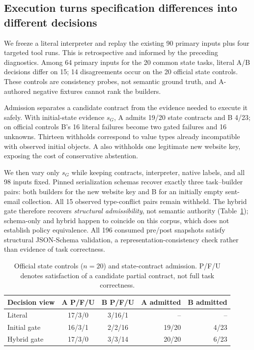 \subsection{Execution turns specification differences into different decisions}
\label{sec:contract-execution}
We freeze a literal interpreter and replay the existing 90 primary inputs plus four targeted tool runs. This is retrospective and informed by the preceding diagnostics. Among 64 primary inputs for the 20 common state tasks, literal A/B decisions differ on 15; 14 disagreements occur on the 20 official state controls. These controls are consistency probes, not semantic ground truth, and A-authored negative fixtures cannot rank the builders.

Admission separates a candidate contract from the evidence needed to execute it safely. With initial-state evidence $s_G$, A admits 19/20 state contracts and B 4/23; on official controls B's 16 literal failures become two gated failures and 16 unknowns. Thirteen withholds correspond to value types already incompatible with observed initial objects. A also withholds one legitimate new website key, exposing the cost of conservative abstention.

We then vary only $s_G$ while keeping contracts, interpreter, native labels, and all 98 inputs fixed. Pinned serialization schemas recover exactly three task--builder pairs: both builders for the new website key and B for an initially empty sent-email collection. All 15 observed type-conflict pairs remain withheld. The hybrid gate therefore recovers \emph{structural admissibility}, not semantic authority (Table~\ref{tab:contract-execution}); schema-only and hybrid happen to coincide on this corpus, which does not establish policy equivalence. All 196 consumed pre/post snapshots satisfy structural JSON-Schema validation, a representation-consistency check rather than evidence of task correctness.

\begin{table}[t]
\centering\small
\caption{Official state controls ($n=20$) and state-contract admission. P/F/U denotes satisfaction of a candidate partial contract, not full task correctness.}
\label{tab:contract-execution}
\begin{tabular}{@{}lccrr@{}}
\toprule
Decision view & A P/F/U & B P/F/U & A admitted & B admitted \\
\midrule
Literal & 17/3/0 & 3/16/1 & -- & -- \\
Initial gate & 16/3/1 & 2/2/16 & 19/20 & 4/23 \\
Hybrid gate & 17/3/0 & 3/3/14 & 20/20 & 6/23 \\
\bottomrule
\end{tabular}
\end{table}

